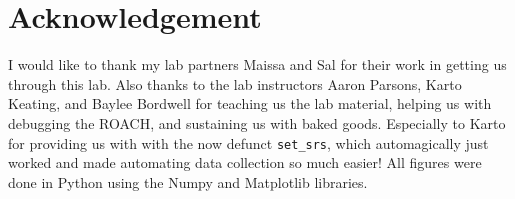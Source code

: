 \documentclass[12pt]{article}
\begin{document}
\section*{Acknowledgement}
I would like to thank my lab partners Maissa and Sal for their work in getting us through this lab. Also thanks to the lab instructors Aaron Parsons, Karto Keating, and Baylee Bordwell for teaching us the lab material, helping us with debugging the ROACH, and sustaining us with baked goods. Especially to Karto for providing us with with the now defunct \texttt{set\_srs}, which automagically just worked and made automating data collection so much easier!
All figures were done in Python using the Numpy and Matplotlib libraries.
\end{document}
